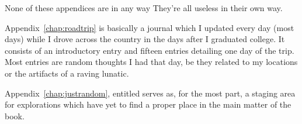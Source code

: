\documentclass[../butidigress.tex]{subfiles}
\begin{document}
None of these appendices are in any way 
They're all useless in their own way.

Appendix~\ref{chap:roadtrip} is basically a journal which I updated every day (most days) while I drove across the country in the days after I graduated college.
It consists of an introductory entry and fifteen entries detailing one day of the trip.
Most entries are random thoughts I had that day, be they related to my locations or the artifacts of a raving lunatic.

Appendix~\ref{chap:justrandom}, entitled  serves as, for the most part, a staging area for explorations which have yet to find a proper place in the main matter of the book.














\end{document}
